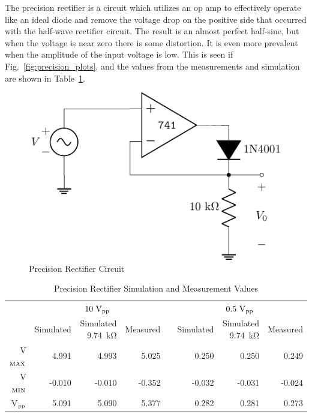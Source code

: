 \documentclass{../../ece-report}
\begin{document}
The precision rectifier is a circuit which utilizes
an op amp to effectively operate like an ideal diode
and remove the voltage drop on the positive side that
occurred with the half-wave rectifier circuit. The result
is an almost perfect half-sine, but when the voltage is near
zero there is some distortion. It is even more prevalent
when the amplitude of the input voltage is low. This is seen
if Fig.~\ref{fig:precision_plots}, and the values from the 
measurements and simulation are shown in Table~\ref{tab:precision}.

\begin{figure}[h!]
  \centering
  \includegraphics{../circuits/precision_circuit.pdf}
  \caption{Precision Rectifier Circuit}
  \label{fig:precision_circuit}
\end{figure}

\begin{table}[h!]
  \centering
  \begin{tabular}{rrrrcrrr}\toprule
    & \multicolumn{3}{c}{$10~\si{\V}_\textnormal{pp}$} & & \multicolumn{3}{c}{$0.5~\si{\V}_\textnormal{pp}$} \\
    \cmidrule(lr){2-4} \cmidrule(lr){6-8}
    & Simulated & Simulated 9.74~\si{\kohm} & Measured & & Simulated & Simulated 9.74~\si{\kohm} & Measured \\
    V$_\textnormal{MAX}$ & 4.991  & 4.993  & 5.025  &    & 0.250  & 0.250  & 0.249  \\
    V$_\textnormal{MIN}$ & -0.010 & -0.010 & -0.352 &    & -0.032 & -0.031 & -0.024 \\
    V$_\textnormal{pp}$ &  5.091  & 5.090  & 5.377  &    & 0.282  & 0.281  & 0.273 \\
    \bottomrule
  \end{tabular}
  \caption{Precision Rectifier Simulation and Measurement Values}
  \label{tab:precision}
\end{table}
\end{document}
